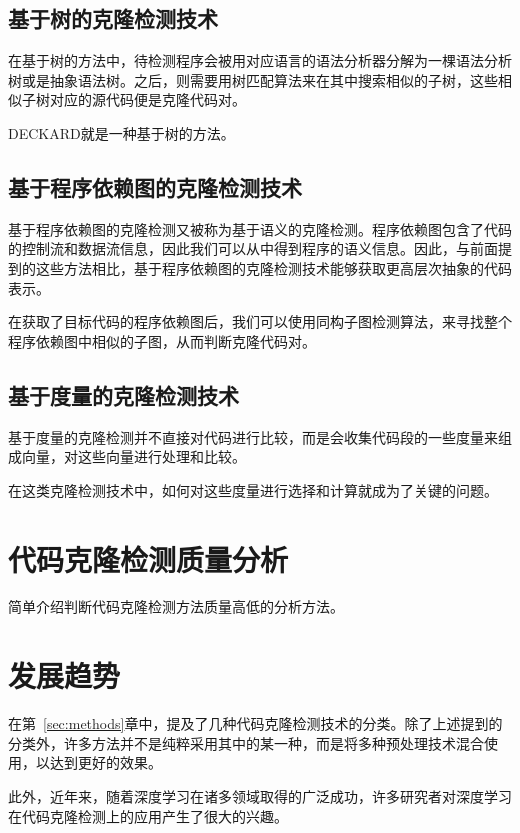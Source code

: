 \documentclass[UTF8]{ctexart}
\begin{document}
\subsection{基于树的克隆检测技术}

在基于树的方法中，待检测程序会被用对应语言的语法分析器分解为一棵语法分析树或是抽象语法树。之后，则需要用树匹配算法来在其中搜索相似的子树，这些相似子树对应的源代码便是克隆代码对。

DECKARD\cite{Jiang2007}就是一种基于树的方法。

\subsection{基于程序依赖图的克隆检测技术}

基于程序依赖图的克隆检测又被称为基于语义的克隆检测。程序依赖图包含了代码的控制流和数据流信息，因此我们可以从中得到程序的语义信息。因此，与前面提到的这些方法相比，基于程序依赖图的克隆检测技术能够获取更高层次抽象的代码表示。

在获取了目标代码的程序依赖图后，我们可以使用同构子图检测算法，来寻找整个程序依赖图中相似的子图，从而判断克隆代码对。

\subsection{基于度量的克隆检测技术}

基于度量的克隆检测并不直接对代码进行比较，而是会收集代码段的一些度量来组成向量，对这些向量进行处理和比较。

在这类克隆检测技术中，如何对这些度量进行选择和计算就成为了关键的问题。


\section{代码克隆检测质量分析}
简单介绍判断代码克隆检测方法质量高低的分析方法。

\section{发展趋势}
在第~\ref{sec:methods}章中，提及了几种代码克隆检测技术的分类。除了上述提到的分类外，许多方法并不是纯粹采用其中的某一种，而是将多种预处理技术混合使用，以达到更好的效果。

此外，近年来，随着深度学习在诸多领域取得的广泛成功，许多研究者对深度学习在代码克隆检测上的应用产生了很大的兴趣。
\end{document}
